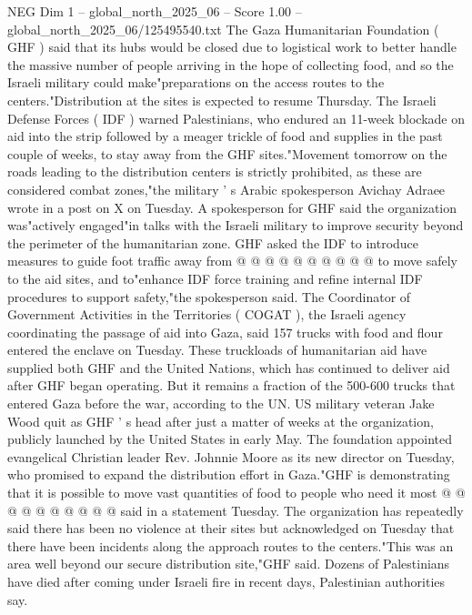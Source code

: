 \begin{textsample}{NEG Dim 1 – global\_north\_2025\_06 – Score 1.00 – global\_north\_2025\_06/125495540.txt}  \label{ex:f1_neg_120}
The Gaza Humanitarian Foundation ( GHF ) said that its hubs would be closed due to logistical work to better handle the massive number of people arriving in the hope of collecting food, and so the Israeli military could make"preparations on the access routes to the centers."Distribution at the sites is expected to resume Thursday.
The Israeli Defense Forces ( IDF ) warned Palestinians, who endured an 11-week blockade on aid into the strip followed by a meager trickle of food and supplies in the past couple of weeks, to stay away from the GHF sites."Movement tomorrow on the roads leading to the distribution centers is strictly prohibited, as these are considered combat zones,"the military ' s Arabic spokesperson Avichay Adraee wrote in a post on X on Tuesday.
A spokesperson for GHF said the organization was"actively engaged"in talks with the Israeli military to improve security beyond the perimeter of the humanitarian zone.
GHF asked the IDF to introduce measures to guide foot traffic away from @ @ @ @ @ @ @ @ @ @ to move safely to the aid sites, and to"enhance IDF force training and refine internal IDF procedures to support safety,"the spokesperson said.
The Coordinator of Government Activities in the Territories ( COGAT ), the Israeli agency coordinating the passage of aid into Gaza, said 157 trucks with food and flour entered the enclave on Tuesday.
These truckloads of humanitarian aid have supplied both GHF and the United Nations, which has continued to deliver aid after GHF began operating.
But it remains a fraction of the 500-600 trucks that entered Gaza before the war, according to the UN.
US military veteran Jake Wood quit as GHF ' s head after just a matter of weeks at the organization, publicly launched by the United States in early May.
The foundation appointed evangelical Christian leader Rev.
Johnnie Moore as its new director on Tuesday, who promised to expand the distribution effort in Gaza."GHF is demonstrating that it is possible to move vast quantities of food to people who need it most @ @ @ @ @ @ @ @ @ @ said in a statement Tuesday.
The organization has repeatedly said there has been no violence at their sites but acknowledged on Tuesday that there have been incidents along the approach routes to the centers."This was an area well beyond our secure distribution site,"GHF said.
Dozens of Palestinians have died after coming under Israeli fire in recent days, Palestinian authorities say.

\end{textsample}

